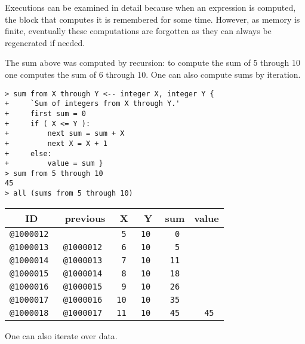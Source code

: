 \documentclass[12pt]{article}
\newenvironment{indpar}[1][0.3in]%
	{\begin{list}{}%
		     {\setlength{\itemsep}{0in}%
		      \setlength{\topsep}{0in}%
		      \setlength{\parsep}{1ex}%
		      \setlength{\labelwidth}{#1}%
		      \setlength{\leftmargin}{#1}%
		      \addtolength{\leftmargin}{\labelsep}}%
	 \item}%
	{\end{list}}
\begin{document}
Executions can be examined in detail because
when an expression is computed, the block that computes it is remembered
for some time.  However, as memory is finite, eventually these
computations are forgotten as they can always be regenerated if
needed.

The sum above was computed by recursion: to compute the sum of 5 through 10
one computes the sum of 6 through 10.  One can also compute sums by
iteration.

\begin{indpar}
\verb|> sum from X through Y <-- integer X, integer Y {| \\
\verb|+     `Sum of integers from X through Y.'| \\
\verb|+     first sum = 0| \\
\verb|+     if ( X <= Y ):| \\
\verb|+         next sum = sum + X| \\
\verb|+         next X = X + 1| \\
\verb|+     else:| \\
\verb|+         value = sum }| \\
\verb|> sum from 5 through 10| \\
\verb|45| \\
\verb|> all (sums from 5 through 10)| \\
\begin{tabular}{|r|r|r|r|r|r|}
\hline
\multicolumn{1}{|c}{\bf ID} &
\multicolumn{1}{|c}{\bf previous} &
\multicolumn{1}{|c}{\bf X} &
\multicolumn{1}{|c}{\bf Y} &
\multicolumn{1}{|c}{\bf sum} &
\multicolumn{1}{|c|}{\bf value} \\
\hline
\tt @1000012 &              & \tt 5	& \tt 10   & \tt 0	& \\
\tt @1000013 & \tt @1000012 & \tt 6	& \tt 10   & \tt 5	& \\
\tt @1000014 & \tt @1000013 & \tt 7	& \tt 10   & \tt 11	& \\
\tt @1000015 & \tt @1000014 & \tt 8	& \tt 10   & \tt 18	& \\
\tt @1000016 & \tt @1000015 & \tt 9	& \tt 10   & \tt 26	& \\
\tt @1000017 & \tt @1000016 & \tt 10	& \tt 10   & \tt 35	& \\
\tt @1000018 & \tt @1000017 & \tt 11	& \tt 10   & \tt 45	& \tt 45 \\
\hline
\end{tabular}
\end{indpar}

One can also iterate over data.
\end{document}
